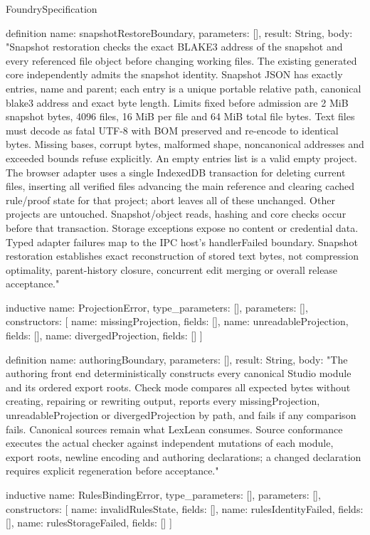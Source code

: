 \begin{lexlean}{FoundrySpecification}
\begin{semanticmodule}
definition{
  name: snapshotRestoreBoundary,
  parameters: [],
  result: String,
  body: "Snapshot restoration checks the exact BLAKE3 address of the snapshot and every referenced file object before changing working files. The existing generated core independently admits the snapshot identity. Snapshot JSON has exactly entries, name and parent; each entry is a unique portable relative path, canonical blake3 address and exact byte length. Limits fixed before admission are 2 MiB snapshot bytes, 4096 files, 16 MiB per file and 64 MiB total file bytes. Text files must decode as fatal UTF-8 with BOM preserved and re-encode to identical bytes. Missing bases, corrupt bytes, malformed shape, noncanonical addresses and exceeded bounds refuse explicitly. An empty entries list is a valid empty project. The browser adapter uses a single IndexedDB transaction for deleting current files, inserting all verified files advancing the main reference and clearing cached rule/proof state for that project; abort leaves all of these unchanged. Other projects are untouched. Snapshot/object reads, hashing and core checks occur before that transaction. Storage exceptions expose no content or credential data. Typed adapter failures map to the IPC host's handlerFailed boundary. Snapshot restoration establishes exact reconstruction of stored text bytes, not compression optimality, parent-history closure, concurrent edit merging or overall release acceptance."
}

inductive{
  name: ProjectionError,
  type_parameters: [],
  parameters: [],
  constructors: [
    {name: missingProjection, fields: []},
    {name: unreadableProjection, fields: []},
    {name: divergedProjection, fields: []}
  ]
}

definition{
  name: authoringBoundary,
  parameters: [],
  result: String,
  body: "The authoring front end deterministically constructs every canonical Studio module and its ordered export roots. Check mode compares all expected bytes without creating, repairing or rewriting output, reports every missingProjection, unreadableProjection or divergedProjection by path, and fails if any comparison fails. Canonical sources remain what LexLean consumes. Source conformance executes the actual checker against independent mutations of each module, export roots, newline encoding and authoring declarations; a changed declaration requires explicit regeneration before acceptance."
}

inductive{
  name: RulesBindingError,
  type_parameters: [],
  parameters: [],
  constructors: [
    {name: invalidRulesState, fields: []},
    {name: rulesIdentityFailed, fields: []},
    {name: rulesStorageFailed, fields: []}
  ]
}


\end{semanticmodule}
\end{lexlean}
